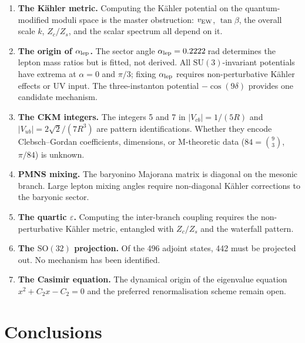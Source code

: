 \documentclass[12pt,a4paper]{article}
\newcommand{\SU}{\mathrm{SU}}
\newcommand{\SO}{\mathrm{SO}}
\begin{document}
\begin{enumerate}
  \item \textbf{The K\"ahler metric.}
    Computing the K\"ahler potential on the quantum-modified moduli
    space is the master obstruction: $v_{\rm EW}$, $\tan\beta$,
    the overall scale $k$, $Z_c/Z_s$, and the scalar spectrum all
    depend on it.

  \item \textbf{The origin of $\alpha_{\rm lep}$.}
    The sector angle $\alpha_{\rm lep} = 0.2222$\,rad determines the
    lepton mass ratios but is fitted, not derived.
    All $\SU(3)$-invariant potentials have extrema at
    $\alpha = 0$ and $\pi/3$; fixing $\alpha_{\rm lep}$ requires
    non-perturbative K\"ahler effects or UV input.
    The three-instanton potential $-\cos(9\delta)$ provides one
    candidate mechanism.

  \item \textbf{The CKM integers.}
    The integers 5 and 7 in $|V_{cb}| = 1/(5R)$ and
    $|V_{ub}| = 2\sqrt{2}/(7R^3)$ are pattern identifications.
    Whether they encode Clebsch--Gordan coefficients, dimensions,
    or M-theoretic data ($84 = \binom{9}{3}$, $\pi/84$)
    is unknown.

  \item \textbf{PMNS mixing.}
    The baryonino Majorana matrix is diagonal on the mesonic branch.
    Large lepton mixing angles require non-diagonal K\"ahler
    corrections to the baryonic sector.

  \item \textbf{The quartic $\varepsilon$.}
    Computing the inter-branch coupling requires the
    non-perturbative K\"ahler metric, entangled with
    $Z_c/Z_s$ and the waterfall pattern.

  \item \textbf{The $\SO(32)$ projection.}
    Of the 496 adjoint states, 442 must be projected out.
    No mechanism has been identified.

  \item \textbf{The Casimir equation.}
    The dynamical origin of the eigenvalue equation
    $x^2 + C_2 x - C_2 = 0$ and the preferred renormalisation
    scheme remain open.
\end{enumerate}


\section{Conclusions}
\label{sec:conclusion}
\end{document}
